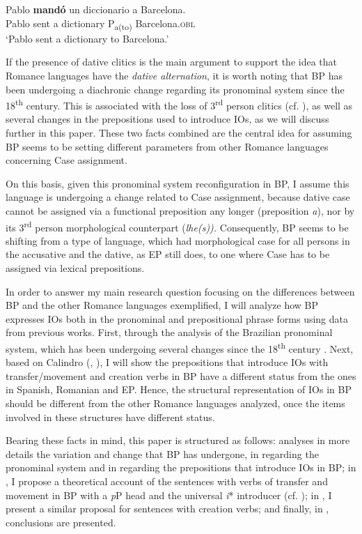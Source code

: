 \documentclass[output=paper,colorlinks,citecolor=brown,modfonts,nonflat]{langsci/langscibook}
\begin{document}
\ea%
    \label{ex:calindro:9}
    \gll Pablo \textbf{mandó} un diccionario  {a} {Barcelona}.\\
    Pablo  sent      a dictionary     P\textsubscript{{a(to)}} Barcelona.\textsc{obl}\\
    \glt `Pablo sent a dictionary to Barcelona.'\hfill \citep[48]{Cuervo2003}
    \z

If the presence of dative clitics is the main argument to support the idea that Romance languages have the \textit{dative alternation}, it is worth noting that BP has been undergoing a diachronic change regarding its pronominal system since the 18\textsuperscript{th} century. This is associated with the loss of 3\textsuperscript{rd} person clitics (cf. \citealt{CarvalhoCalindro2018}), as well as several changes in the prepositions used to introduce IOs, as we will discuss further in this paper. These two facts combined are the central idea for assuming BP seems to be setting different parameters from other Romance languages concerning Case assignment.

On this basis, given this pronominal system reconfiguration in BP, I assume this language is undergoing a change related to Case assignment, because dative case cannot be assigned via a functional preposition any longer (preposition \textit{a}), nor by its 3\textsuperscript{rd} person morphological counterpart (\textit{lhe(s)).} Consequently, BP seems to be shifting from a type of language, which had morphological case for all persons in the accusative and the dative, as EP still does, to one where Case has to be assigned via lexical prepositions.

In order to answer my main research question focusing on the differences between BP and the other Romance languages exemplified, I will analyze how BP expresses IOs both in the pronominal and prepositional phrase forms using data from previous works. First, through the analysis of the Brazilian pronominal system, which has been undergoing several changes since the 18\textsuperscript{th} century \citep{KatoCyrinoCorrêa2009}. Next, based on Calindro (\citeyear{Calindro2015}, \citeyear{Calindro2016}), I will show the prepositions that introduce IOs with transfer/movement and creation verbs in BP have a different status from the ones in Spanish, Romanian and EP. Hence, the structural representation of IOs in BP should be different from the other Romance languages analyzed, once the items involved in these structures have different status.

Bearing these facts in mind, this paper is structured as follows:  analyses in more details the variation and change that BP has undergone, in  regarding the pronominal system and in  regarding the prepositions that introduce IOs in BP; in , I propose a theoretical account of the sentences with verbs of transfer and movement in BP with a \textit{p}P head and the universal \textit{i}* introducer (cf. \citealt{Wood2012, WoodMarantz2017}); in , I present a similar proposal for sentences with creation verbs; and finally, in , conclusions are presented.
\end{document}
